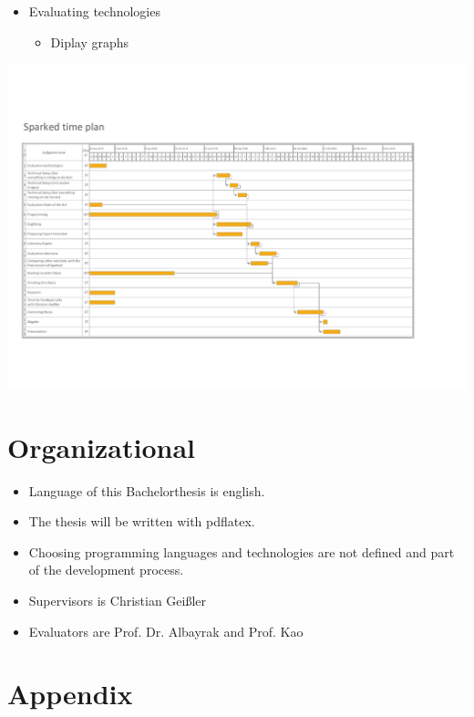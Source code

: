 \documentclass[12pt,a4paper,titlepage,oneside,BCOR1cm]{scrreprt}
\begin{document}
\begin{itemize}
\item Evaluating technologies

\begin{itemize}
\item Diplay graphs
\end{itemize}
\end{itemize}

\hspace*{-1.5in}
\includegraphics[width=\paperwidth]{gantt-proposal-2.pdf}

\chapter{Organizational}
\begin{itemize}
\item Language of this Bachelorthesis is english.
\item The thesis will be written with pdflatex.
\item Choosing programming languages and technologies are not defined and part of the development process.
\item Supervisors is Christian Geißler
\item Evaluators are Prof. Dr. Albayrak and Prof. Kao \cite{inproceedings}
\end{itemize}

\chapter{Appendix}
\end{document}
